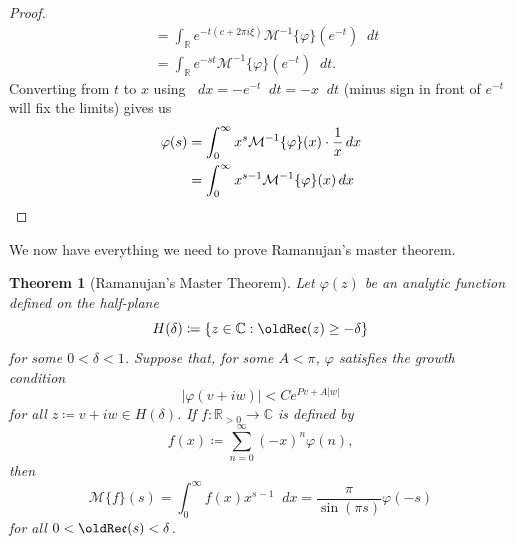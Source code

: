 \documentclass[a4paper]{article}
\newcommand*\diff{\mathop{}\!d} %
\newcommand{\R}{\mathbb{R}}
\newcommand{\C}{\mathbb{C}}
\renewcommand{\Re}{\mathop{\oldRe\mathfrak{e}}}
\newtheorem{theorem}{Theorem}
\theoremstyle{definition}
\begin{document}
\begin{proof}
\begin{align*}
                   & = \int_\R e^{-t(c+2\pi i \xi)} \mathcal{M}^{-1}\{\varphi\}\left(e^{-t}\right) \diff t      \\
                   & = \int_\R e^{-st} \mathcal{M}^{-1}\{\varphi\}\left(e^{-t}\right) \diff t.
    \end{align*}
    Converting from $t$ to $x$ using $\diff x = -e^{-t} \diff t = -x \diff t$ (minus sign in front of $e^{-t}$ will fix the limits) gives us
    \begin{align*}
        \varphi(s) & = \int_0^\infty x^{s} \mathcal{M}^{-1}\{\varphi\}(x) \cdot \frac{1}{x} \diff x \\
                   & = \int_0^\infty x^{s-1} \mathcal{M}^{-1}\{\varphi\}(x) \diff x \qedhere
    \end{align*}
\end{proof}
We now have everything we need to prove Ramanujan's master theorem.
\begin{theorem}[Ramanujan's Master Theorem] \label{thm:RMT}
    Let $\varphi(z)$ be an analytic function defined on the half-plane
    \begin{equation*}
        H(\delta) \coloneq \{z \in \C : \Re(z) \geq - \delta \}
    \end{equation*}
    for some $0 < \delta < 1$.
    Suppose that, for some $A < \pi$, $\varphi$ satisfies the growth condition
    \begin{equation*}
        \lvert \varphi(v+iw) \rvert < Ce^{Pv+A\lvert w \rvert}
    \end{equation*}
    for all $z \coloneq v + iw \in H(\delta)$.
    If $f \colon \R_{>0} \to \C$ is defined by
    \begin{equation*}
        f(x) \coloneq \sum_{n=0}^\infty (-x)^n \varphi(n),
    \end{equation*}
    then
    \begin{equation}
        \mathcal{M}\{f\}(s) = \int_0^\infty f(x) x^{s-1} \diff x = \frac{\pi}{\sin(\pi s)} \varphi(-s)
    \end{equation}
    for all $0 < \Re (s)< \delta$.
\end{theorem}
\end{document}
